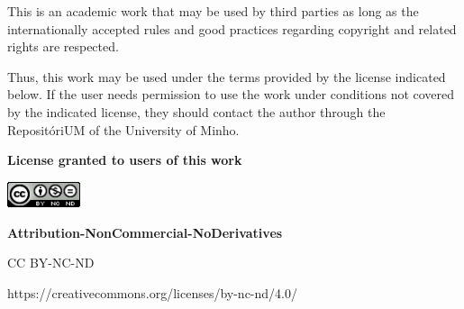 This is an academic work that may be used by third parties as long as the internationally accepted rules and good practices regarding copyright and related rights are respected.

Thus, this work may be used under the terms provided by the license indicated below. If the user needs permission to use the work under conditions not covered by the indicated license, they should contact the author through the RepositóriUM of the University of Minho.

\vfill
\begin{minipage}{\textwidth}
\textbf{License granted to users of this work}
   
\includegraphics[width=0.16\textwidth]{assets/copyright/copy-right.png} %

\textbf{Attribution-NonCommercial-NoDerivatives}

CC BY-NC-ND

https://creativecommons.org/licenses/by-nc-nd/4.0/
\end{minipage}

\newpage